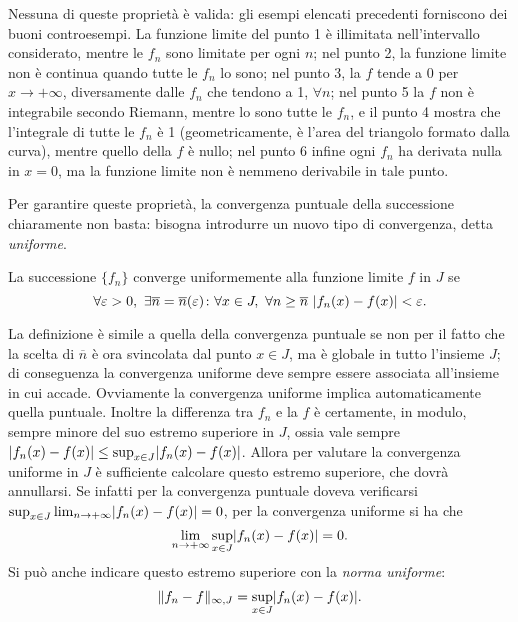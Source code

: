 Nessuna di queste proprietà è valida: gli esempi elencati precedenti forniscono dei buoni controesempi. La funzione limite del punto 1 è illimitata nell'intervallo considerato, mentre le $f_n$ sono limitate per ogni $n$; nel punto 2, la funzione limite non è continua quando tutte le $f_n$ lo sono; nel punto 3, la $f$ tende a 0 per $x\to+\infty$, diversamente dalle $f_n$ che tendono a 1, $\forall n$; nel punto 5 la $f$ non è integrabile secondo Riemann, mentre lo sono tutte le $f_n$, e il punto 4 mostra che l'integrale di tutte le $f_n$ è 1 (geometricamente, è l'area del triangolo formato dalla curva), mentre quello della $f$ è nullo; nel punto 6 infine ogni $f_n$ ha derivata nulla in $x=0$, ma la funzione limite non è nemmeno derivabile in tale punto.

Per garantire queste proprietà, la convergenza puntuale della successione chiaramente non basta: bisogna introdurre un nuovo tipo di convergenza, detta \emph{uniforme}.
\begin{definizione} \label{d:conv_uniforme_succ}
La successione $\{f_n\}$ converge uniformemente alla funzione limite $f$ in $J$ se
\begin{equation} \label{eq:conv_uniforme_succ}
\forall\epsilon>0,\ \exists\overline{n}=\overline{n}(\epsilon)\colon\forall x\in J,\ \forall n\geq\overline{n}\ \abs{f_n(x)-f(x)}<\epsilon.
\end{equation}
\end{definizione}
La definizione è simile a quella della convergenza puntuale se non per il fatto che la scelta di $\overline{n}$ è ora svincolata dal punto $x\in J$, ma è globale in tutto l'insieme $J$; di conseguenza la convergenza uniforme deve sempre essere associata all'insieme in cui accade. Ovviamente la convergenza uniforme implica automaticamente quella puntuale.
Inoltre la differenza tra $f_n$ e la $f$ è certamente, in modulo, sempre minore del suo estremo superiore in $J$, ossia vale sempre $\lvert f_n(x)-f(x)\rvert\leq\sup_{x\in J}\lvert f_n(x)-f(x)\rvert$. Allora per valutare la convergenza uniforme in $J$ è sufficiente calcolare questo estremo superiore, che dovrà annullarsi. Se infatti per la convergenza puntuale doveva verificarsi $\sup_{x\in J}\lim_{n\to+\infty}\lvert f_n(x)-f(x)\rvert=0$, per la convergenza uniforme si ha che
\begin{equation}
\lim_{n\to+\infty}\sup_{x\in J}\lvert f_n(x)-f(x)\rvert=0.
\end{equation}
Si può anche indicare questo estremo superiore con la \emph{norma uniforme}:
\[
\lVert f_n-f\rVert_{\infty,J}=\sup_{x\in J}\lvert f_n(x)-f(x)\rvert.
\]
